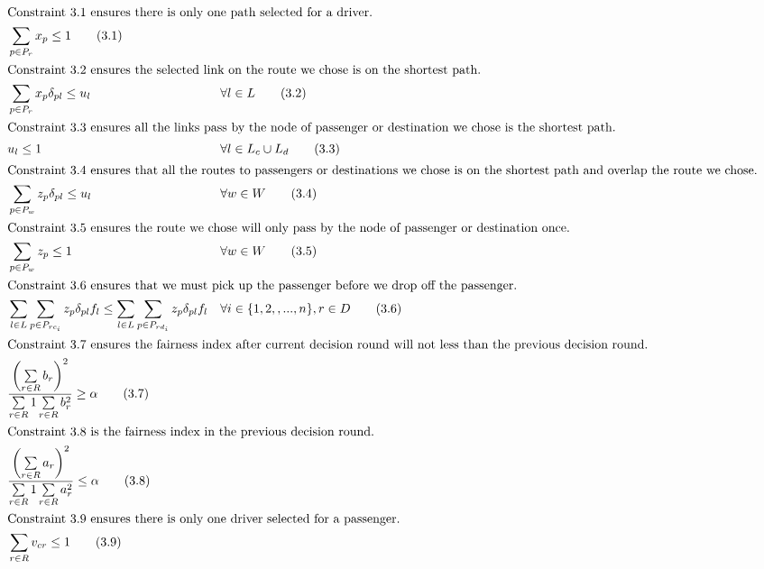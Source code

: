 \begin{align*}
  \intertext{Constraint 3.1 ensures there is only one path selected for a driver.}
  & \sum\limits_{p \in P_r} x_p \leq 1 \tag{3.1} \\
  \intertext{Constraint 3.2 ensures the selected link on the route we chose is on the shortest path.}
  & \sum\limits_{p \in P_r} x_p \delta_{pl} \leq u_l && \forall l \in L \tag{3.2} \\
  \intertext{Constraint 3.3 ensures all the links pass by the node of passenger or destination we chose is the shortest path.}
  & u_l \leq 1 && \forall l \in L_c \cup L_d \tag{3.3} \\
  \intertext{Constraint 3.4 ensures that all the routes to passengers or destinations we chose is on the shortest path and overlap the route we chose.}
  & \sum\limits_{p \in P_w} z_p \delta_{pl} \leq u_l && \forall w \in W \tag{3.4} \\
  \intertext{Constraint 3.5 ensures the route we chose will only pass by the node of passenger or destination once.}
  & \sum\limits_{p \in P_w} z_p \leq 1 && \forall w \in W \tag{3.5} \\
  \intertext{Constraint 3.6 ensures that we must pick up the passenger before we drop off the passenger.}
  & \sum\limits_{l \in L} \sum\limits_{p \in P_{rc_i}} z_p \delta_{pl} f_l \leq \sum\limits_{l \in L} \sum\limits_{p \in P_{rd_i}} z_p \delta_{pl} f_l && \forall i \in \{1,2,,...,n\}, r \in D \tag{3.6} \\
  \intertext{Constraint 3.7 ensures the fairness index after current decision round will not less than the previous decision round.}
  & \frac{\left(\sum\limits_{r \in R} b_r\right)^2}{\sum\limits_{r \in R} 1 \sum\limits_{r \in R} b_r^2} \geq \alpha \tag{3.7} \\
  \intertext{Constraint 3.8 is the fairness index in the previous decision round.}
  & \frac{\left(\sum\limits_{r \in R} a_r\right)^2}{\sum\limits_{r \in R} 1 \sum\limits_{r \in R} a_r^2} \leq \alpha \tag{3.8} \\
  \intertext{Constraint 3.9 ensures there is only one driver selected for a passenger.}
  & \sum\limits_{r \in R} v_{cr} \leq 1 \tag{3.9} \\
\end{align*}
